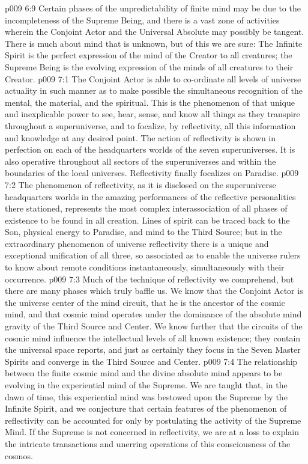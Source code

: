 \vs p009 6:9 \pc Certain phases of the unpredictability of finite mind may be due to the incompleteness of the Supreme Being, and there is a vast zone of activities wherein the Conjoint Actor and the Universal Absolute may possibly be tangent. There is much about mind that is unknown, but of this we are sure: The Infinite Spirit is the perfect expression of the mind of the Creator to all creatures; the Supreme Being is the evolving expression of the minds of all creatures to their Creator.
\vs p009 7:1 The Conjoint Actor is able to co\hyp{}ordinate all levels of universe actuality in such manner as to make possible the simultaneous recognition of the mental, the material, and the spiritual. This is the phenomenon of  that unique and inexplicable power to see, hear, sense, and know all things as they transpire throughout a superuniverse, and to focalize, by reflectivity, all this information and knowledge at any desired point. The action of reflectivity is shown in perfection on each of the headquarters worlds of the seven superuniverses. It is also operative throughout all sectors of the superuniverses and within the boundaries of the local universes. Reflectivity finally focalizes on Paradise.
\vs p009 7:2 The phenomenon of reflectivity, as it is disclosed on the superuniverse headquarters worlds in the amazing performances of the reflective personalities there stationed, represents the most complex interassociation of all phases of existence to be found in all creation. Lines of spirit can be traced back to the Son, physical energy to Paradise, and mind to the Third Source; but in the extraordinary phenomenon of universe reflectivity there is a unique and exceptional unification of all three, so associated as to enable the universe rulers to know about remote conditions instantaneously, simultaneously with their occurrence.
\vs p009 7:3 Much of the technique of reflectivity we comprehend, but there are many phases which truly baffle us. We know that the Conjoint Actor is the universe center of the mind circuit, that he is the ancestor of the cosmic mind, and that cosmic mind operates under the dominance of the absolute mind gravity of the Third Source and Center. We know further that the circuits of the cosmic mind influence the intellectual levels of all known existence; they contain the universal space reports, and just as certainly they focus in the Seven Master Spirits and converge in the Third Source and Center.
\vs p009 7:4 \pc The relationship between the finite cosmic mind and the divine absolute mind appears to be evolving in the experiential mind of the Supreme. We are taught that, in the dawn of time, this experiential mind was bestowed upon the Supreme by the Infinite Spirit, and we conjecture that certain features of the phenomenon of reflectivity can be accounted for only by postulating the activity of the Supreme Mind. If the Supreme is not concerned in reflectivity, we are at a loss to explain the intricate transactions and unerring operations of this consciousness of the cosmos.
